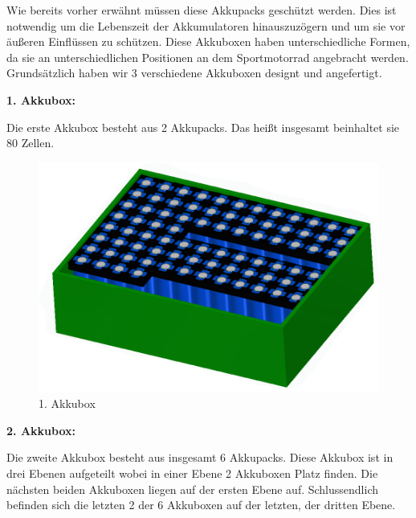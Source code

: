 Wie bereits vorher erwähnt müssen diese Akkupacks geschützt werden. Dies ist notwendig um die Lebenszeit der Akkumulatoren hinauszuzögern und um sie vor äußeren Einflüssen zu schützen. Diese Akkuboxen haben unterschiedliche Formen, da sie an unterschiedlichen Positionen an dem Sportmotorrad angebracht werden. Grundsätzlich haben wir 3 verschiedene Akkuboxen designt und angefertigt.

\textbf{1. Akkubox:}

Die erste Akkubox besteht aus 2 Akkupacks. Das heißt insgesamt beinhaltet sie 80 Zellen.

\begin{figure}[H]
	\begin{center}
		\includegraphics[scale=0.5]{figures/Akku/Akkubox1.PNG}
		\caption{1. Akkubox}
	\end{center}
\end{figure}

\textbf{2. Akkubox:}

Die zweite Akkubox besteht aus insgesamt 6 Akkupacks. Diese Akkubox ist in drei Ebenen aufgeteilt wobei in einer Ebene 2 Akkuboxen Platz finden. Die nächsten beiden Akkuboxen liegen auf der ersten Ebene auf. Schlussendlich befinden sich die letzten 2 der 6 Akkuboxen auf der letzten, der dritten Ebene.


